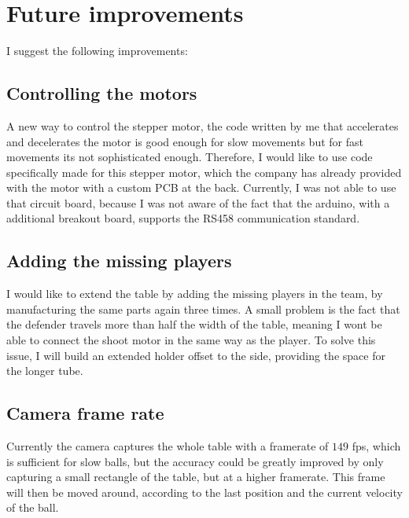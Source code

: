 \section{Future improvements}\label{sec:improvements}
I suggest the following improvements:
\subsection*{Controlling the motors}
A new way to control the stepper motor, the code written by me that accelerates and decelerates the motor is good enough for slow movements but for fast movements its not sophisticated enough.
Therefore, I would like to use code specifically made for this stepper motor, which the company has already provided with the motor with a custom PCB at the back.
Currently, I was not able to use that circuit board, because I was not aware of the fact that the arduino, with a additional breakout board, supports the RS458 communication standard.
\subsection*{Adding the missing players}
I would like to extend the table by adding the missing players in the team, by manufacturing the same parts again three times.
A small problem is the fact that the defender travels more than half the width of the table, meaning I wont be able to connect the shoot motor in the same way as the player.
To solve this issue, I will build an extended holder offset to the side, providing the space for the longer tube.
\subsection*{Camera frame rate}
Currently the camera captures the whole table with a framerate of $149$ fps, which is sufficient for slow balls, but the accuracy could be greatly improved by only capturing a small rectangle of the table, but at a higher framerate.
This frame will then be moved around, according to the last position and the current velocity of the ball.



